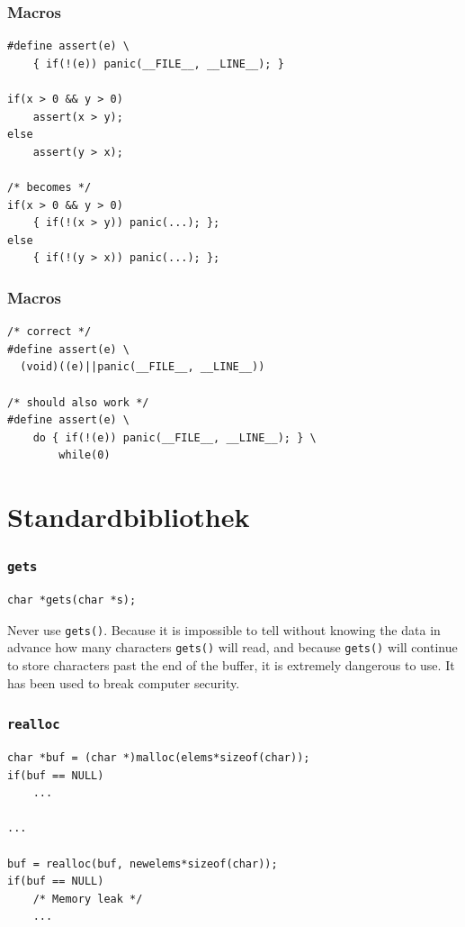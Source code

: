 \documentclass[12pt,compress]{beamer}
\begin{document}
\begin{frame}[fragile]
\frametitle{Macros}

\begin{lstlisting}
#define assert(e) \
	{ if(!(e)) panic(__FILE__, __LINE__); }

if(x > 0 && y > 0)
    assert(x > y);
else
    assert(y > x);

/* becomes */
if(x > 0 && y > 0)
    { if(!(x > y)) panic(...); };
else
    { if(!(y > x)) panic(...); };
\end{lstlisting}
\end{frame}


\begin{frame}[fragile]
\frametitle{Macros}

\begin{lstlisting}
/* correct */
#define assert(e) \
  (void)((e)||panic(__FILE__, __LINE__))

/* should also work */
#define assert(e) \
	do { if(!(e)) panic(__FILE__, __LINE__); } \
		while(0)
\end{lstlisting}
\end{frame}

\section{Standardbibliothek}

\frame {
    \begin{center}
    \color{purple}
    \Huge Standardbibliothek
    \end{center}
}

\begin{frame}[fragile]
\frametitle{\texttt{gets}}

\begin{lstlisting}
char *gets(char *s);
\end{lstlisting}

\vfill

Never use \texttt{gets()}.  Because it is impossible to tell without knowing
the data in advance how many characters \texttt{gets()} will read, and because
\texttt{gets()} will continue to store characters past the end of the buffer,
it is extremely dangerous to use.  It has been used to break computer security.
\end{frame}

\begin{frame}[fragile]
\frametitle{\texttt{realloc}}

\begin{lstlisting}
char *buf = (char *)malloc(elems*sizeof(char));
if(buf == NULL)
	...

...

buf = realloc(buf, newelems*sizeof(char));
if(buf == NULL)
    /* Memory leak */
    ...
\end{lstlisting}
\end{frame}
\end{document}
